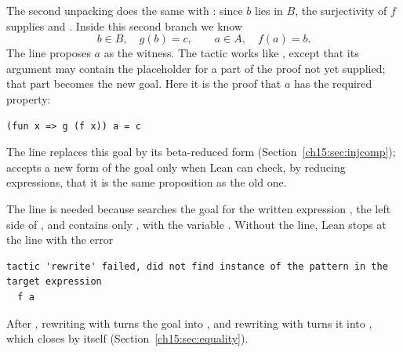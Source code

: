 The second unpacking does the same with : since $b$ lies in $B$, the surjectivity of $f$ supplies  and . Inside this second branch we know
\[
 b\in B,\quad g(b)=c,\qquad a\in A,\quad f(a)=b.
\]
The line  proposes $a$ as the witness. The tactic  works like , except that its argument may contain the placeholder  for a part of the proof not yet supplied; that part becomes the new goal. Here it is the proof that $a$ has the required property:
\par\noindent\begin{minipage}{\linewidth}
\begin{lstlisting}
(fun x => g (f x)) a = c
\end{lstlisting}
\end{minipage}\par
The line  replaces this goal by its beta-reduced form (Section~\ref{ch15:sec:injcomp});  accepts a new form of the goal only when Lean can check, by reducing expressions, that it is the same proposition as the old one.

The  line is needed because  searches the goal for the written expression , the left side of , and  contains only , with the variable . Without the  line, Lean stops at the  line with the error
\par\noindent\begin{minipage}{\linewidth}
\begin{lstlisting}
tactic 'rewrite' failed, did not find instance of the pattern in the target expression
  f a
\end{lstlisting}
\end{minipage}\par
After , rewriting with  turns the goal into , and rewriting with  turns it into , which  closes by itself (Section~\ref{ch15:sec:equality}).



